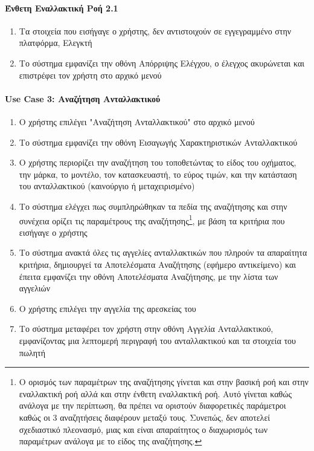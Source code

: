 \documentclass{../ol-softwaremanual}
\begin{document}
	\paragraph{Ένθετη Εναλλακτική Ροή 2.1}
	
	\begin{enumerate}
		\item Τα στοιχεία που εισήγαγε ο χρήστης, δεν αντιστοιχούν σε εγγεγραμμένο στην πλατφόρμα, Ελεγκτή
		\item Το σύστημα εμφανίζει την οθόνη Απόρριψης Ελέγχου, ο έλεγχος ακυρώνεται και επιστρέφει τον χρήστη στο αρχικό μενού
	\end{enumerate}
	
	
	
	
	\paragraph{\en Use Case 3: \gr Αναζήτηση Ανταλλακτικού}	
	
	\begin{enumerate}
		\item Ο χρήστης επιλέγει \en"\gr Αναζήτηση Ανταλλακτικού\en" \gr στο αρχικό μενού
		\item Το σύστημα εμφανίζει την οθόνη Εισαγωγής Χαρακτηριστικών Ανταλλακτικού
		\item Ο χρήστης περιορίζει την αναζήτηση του τοποθετώντας το είδος του οχήματος, την μάρκα, το μοντέλο, τον κατασκευαστή, το εύρος τιμών, και την κατάσταση του ανταλλακτικού (καινούργιο ή μεταχειρισμένο) 
		\item Το σύστημα ελέγχει πως συμπληρώθηκαν τα πεδία της αναζήτησης και στην συνέχεια ορίζει τις παραμέτρους της αναζήτησης\footnote[1]{Ο ορισμός των παραμέτρων της αναζήτησης γίνεται και στην βασική ροή και στην εναλλακτική ροή αλλά και στην ένθετη εναλλακτική ροή. Αυτό γίνεται καθώς ανάλογα με την περίπτωση, θα πρέπει να οριστούν διαφορετικές παράμετροι καθώς οι 3 αναζητήσεις διαφέρουν μεταξύ τους. Συνεπώς, δεν αποτελεί σχεδιαστικό πλεονασμό, μιας και είναι απαραίτητος ο διαχωρισμός των παραμέτρων ανάλογα με το είδος της αναζήτησης.}, με βάση τα κριτήρια που εισήγαγε ο χρήστης
		\item Το σύστημα ανακτά όλες τις αγγελίες ανταλλακτικών που πληρούν τα απαραίτητα κριτήρια, δημιουργεί τα Αποτελέσματα Αναζήτησης (εφήμερο αντικείμενο) και έπειτα εμφανίζει την οθόνη Αποτελέσματα Αναζήτησης, με την λίστα των αγγελιών
		\item Ο χρήστης επιλέγει την αγγελία της αρεσκείας του
		\item Το σύστημα μεταφέρει τον χρήστη στην οθόνη Αγγελία Ανταλλακτικού, εμφανίζοντας μια λεπτομερή περιγραφή του ανταλλακτικού και τα στοιχεία του πωλητή		
	\end{enumerate}
	
\end{document}
